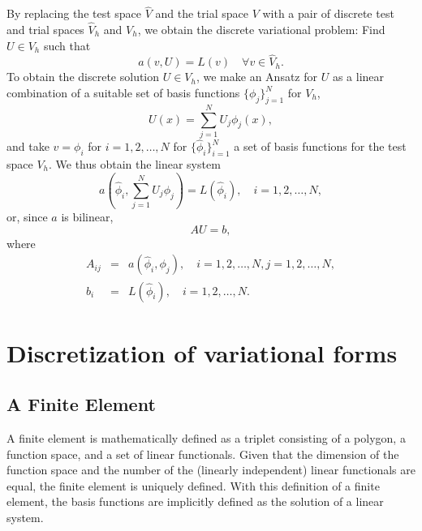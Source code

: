 By replacing the test space $\hat{V}$ and the trial space $V$ with a
pair of discrete test and trial spaces $\hat{V}_h$ and $V_h$, we
obtain the discrete variational problem: Find $U \in V_h$ such that
\begin{equation}
  a(v, U) = L(v) \quad \forall v \in \hat{V}_h.
\end{equation}
To obtain the discrete solution $U \in V_h$, we make an Ansatz
 for $U$ as a linear combination of a
suitable set of basis functions $\{\phi_j\}_{j=1}^N$ for $V_h$,
\begin{equation}
  U(x) = \sum_{j=1}^N U_j \phi_j(x),
\end{equation}
and take $v = \phi_i$ for $i = 1,2,\ldots,N$ for
$\{\hat{\phi}_i\}_{i=1}^N$ a set of basis functions for the test space
$V_h$. We thus obtain the linear system
\begin{equation}
  a(\hat{\phi}_i, \sum_{j=1}^N U_j \phi_j) = L(\hat{\phi}_i), \quad i = 1,2,\ldots,N,
\end{equation}
or, since $a$ is bilinear,
\begin{equation}
  A U = b,
\end{equation}
where
\begin{eqnarray}
  A_{ij} &=& a(\hat{\phi}_i, \phi_j), \quad i = 1,2,\ldots,N, j = 1,2,\ldots,N, \\
  b_i &=& L(\hat{\phi}_i), \quad i = 1,2,\ldots,N.
\end{eqnarray}

\section{Discretization of variational forms}

\subsection{A Finite Element}

A finite element is mathematically defined as a triplet consisting
of a polygon, a function space, and a set of linear functionals. 
Given that the dimension of the function space and the number of
the (linearly independent) linear functionals are equal, the
finite element is uniquely defined. 
With this definition of a finite element, the basis functions
are implicitly defined as the solution of a linear system. 

